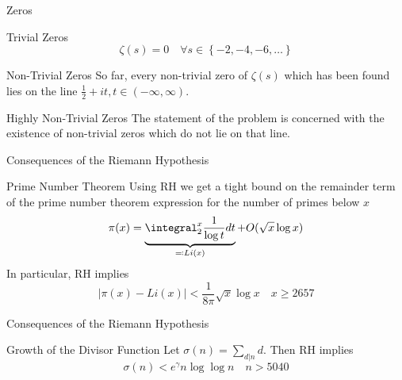 \documentclass[handout]{beamer}
\begin{document}
  \begin{frame}{Zeros}
      \pause
      \begin{block}{Trivial Zeros}
          $$
          \zeta(s) = 0 \quad \forall s \in \left\{-2, -4, -6, \ldots \right\}
          $$
      \end{block}
      \pause
      \begin{block}{Non-Trivial Zeros}
          So far, every non-trivial zero of $\zeta(s)$ which has been found
          lies on the line $\frac{1}{2} + it, t \in (-\infty, \infty)$.
      \end{block}
      \pause
      \begin{block}{Highly Non-Trivial Zeros}
          The statement of the problem is concerned with the existence of
          non-trivial zeros which do not lie on that line.
      \end{block}
  \end{frame}
  \begin{frame}{Consequences of the Riemann Hypothesis}
      \pause
      \begin{block}{Prime Number Theorem}
          Using RH we get a tight bound on the remainder term of the prime
          number theorem expression for the number of primes below $x$
          $$
          \pi(x) = \underbrace{\integral_{2}^{x} \frac{1}{\log t}
          dt}_{\eqqcolon Li(x)} + O(\sqrt{x}\log x)
          $$\pause
          In particular, RH implies
          $$
          \left| \pi(x) - Li(x) \right| < \frac{1}{8\pi}\sqrt{x}\log x \quad
          x \ge 2657
          $$
      \end{block}
  \end{frame}
  \begin{frame}{Consequences of the Riemann Hypothesis}
      \pause
      \begin{block}{Growth of the Divisor Function}
          Let $\sigma(n) = \sum_{d | n}d$. Then RH implies
          $$
          \sigma(n) < e^{\gamma} n \log\log n \quad n > 5040
          $$
      \end{block}
  \end{frame}
\end{document}
